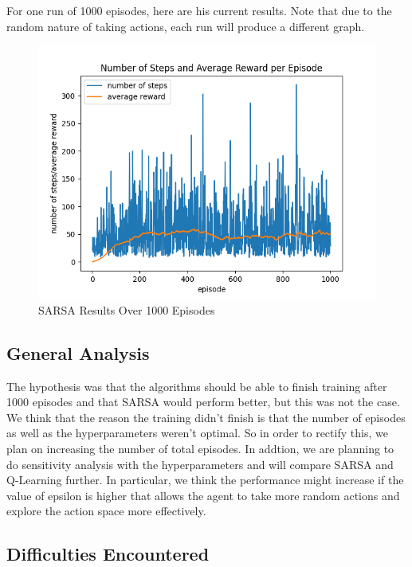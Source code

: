 \documentclass[nohyperref]{article}
\theoremstyle{plain}
\theoremstyle{definition}
\theoremstyle{remark}
\begin{document}
For one run of 1000 episodes, here are his current results. Note that due to the random nature of taking actions, each run will produce a different graph.

\begin{figure}[H] %
    \centering
    \includegraphics[width=1\linewidth]{sarsa-average-1k.png}
    \caption{SARSA Results Over 1000 Episodes}
\end{figure}

\subsection*{General Analysis}

The hypothesis was that the algorithms should be able to finish training after 1000 episodes and that SARSA would perform better, but this was not the case. 
We think that the reason the training didn't finish is that the number of episodes as well as the hyperparameters weren't optimal. 
So in order to rectify this, we plan on increasing the number of total episodes. 
In addtion, we are planning to do sensitivity analysis with the hyperparameters and will compare SARSA and Q-Learning further.
In particular, we think the performance might increase if the value of epsilon is higher that allows the agent to take more random actions and explore the action space more effectively.

\subsection*{Difficulties Encountered}
\end{document}

